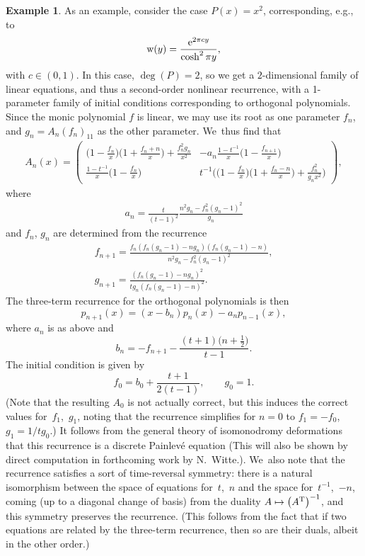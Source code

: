 \documentclass[10pt,a4paper]{amsart}
\theoremstyle{definition}
\newtheorem{Example}[Theorem]{Example}
\numberwithin{equation}{section}
\begin{document}
\begin{Example}
As an example, consider the case $P(x)=x^2$, corresponding, e.g., to
\[
{\rm w}(y)=\frac{{\rm e}^{2\pi cy}}{\cosh^2\pi y},
\]
with $c\in (0,1)$. In this case,
$\deg(P)=2$, so we get a $2$-dimensional family of linear equations, and
thus a second-order nonlinear recurrence, with a 1-parameter family of
initial conditions corresponding to orthogonal polynomials. Since the
monic polynomial $f$ is linear, we may use its root as one parameter $f_n$,
and $g_n=A_n(f_n)_{11}$ as the other parameter. We~thus find that
\begin{gather}
A_n(x)=
\begin{pmatrix}
\big(1-\frac{f_n}{x}\big)\big(1+\frac{f_n+n}{x}\big)+\frac{f_n^2 g_n}{x^2}
&-a_n\frac{1-t^{-1}}{x}\big(1-\frac{f_{n+1}}{x}\big)
\\
\frac{1-t^{-1}}{x}\big(1-\frac{f_n}{x}\big)
&t^{-1}\big(\big(1-\frac{f_n}{x}\big)\big(1+\frac{f_n-n}{x}\big)+\frac{f_n^2}{g_n x^2}\big)
\end{pmatrix} ,
\end{gather}
where
\begin{gather}
a_n = \frac{t}{(t-1)^2}\frac{n^2g_n-f_n^2(g_n-1)^2}{g_n}
\end{gather}
and $f_n$, $g_n$ are determined from the recurrence
\begin{gather}
f_{n+1} =\frac{f_n(f_n(g_n-1)-ng_n)(f_n(g_n-1)-n)}{n^2g_n-f_n^2(g_n-1)^2},
\\
g_{n+1} = \frac{(f_n(g_n-1)-ng_n)^2}{t g_n (f_n(g_n-1)-n)^2}.
\end{gather}
The three-term recurrence for the orthogonal polynomials is then
\[
p_{n+1}(x)=(x-b_n)p_n(x)-a_np_{n-1}(x),
\]
where $a_n$ is as above and
\[
b_n = -f_{n+1}-\frac{(t+1)\big(n+\frac{1}{2}\big)}{t-1}.
\]
The initial condition is given by
\[
f_0 = b_0 + \frac{t+1}{2(t-1)},\qquad
g_0 = 1.
\]
(Note that the resulting $A_0$ is not actually correct, but this induces
the correct values for~$f_1$,~$g_1$, noting that the recurrence simplifies
for $n=0$ to $f_1=-f_0$, $g_1=1/tg_0$.) It follows from the general theory
of isomonodromy deformations~\cite{Ra} that this recurrence is a discrete
Painlev\'e equation (This will also be shown by direct computation in forthcoming work by N.~Witte.). We~also note that the recurrence satisfies a sort of
time-reversal symmetry: there is a natural isomorphism between the space of
equations for~$t$,~$n$ and the space for~$t^{-1}$,~$-n$, coming (up to a diagonal
change of basis) from the duality $A\mapsto \big(A^{\rm T}\big)^{-1}$, and this symmetry
preserves the recurrence. (This follows from the fact that if two
equations are related by the three-term recurrence, then so are their
duals, albeit in the other order.)
\end{Example}
\end{document}
